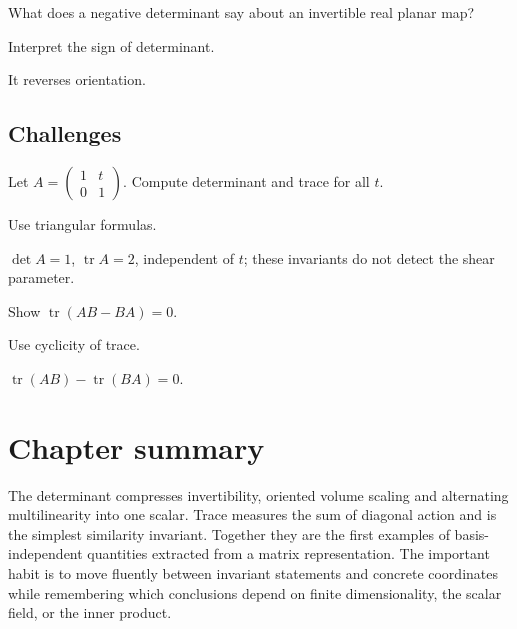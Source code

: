 \begin{exercise}\label{exr:i08-expand-14}
What does a negative determinant say about an invertible real planar map?
\end{exercise}
\begin{hint}
Interpret the sign of determinant.
\end{hint}
\begin{solution}
It reverses orientation.
\end{solution}

\subsection*{Challenges}

\begin{exercise}\label{exr:i08-expand-15}
Let \(A=\begin{pmatrix}1&t\\0&1\end{pmatrix}\). Compute determinant and trace for all \(t\).
\end{exercise}
\begin{hint}
Use triangular formulas.
\end{hint}
\begin{solution}
\(\det A=1\), \(\operatorname{tr}A=2\), independent of \(t\); these invariants do not detect the shear parameter.
\end{solution}

\begin{exercise}\label{exr:i08-expand-16}
Show \(\operatorname{tr}(AB-BA)=0\).
\end{exercise}
\begin{hint}
Use cyclicity of trace.
\end{hint}
\begin{solution}
\(\operatorname{tr}(AB)-\operatorname{tr}(BA)=0\).
\end{solution}
\section*{Chapter summary}
The determinant compresses invertibility, oriented volume scaling and alternating multilinearity into one scalar. Trace measures the sum of diagonal action and is the simplest similarity invariant. Together they are the first examples of basis-independent quantities extracted from a matrix representation.
The important habit is to move fluently between invariant statements and concrete coordinates while remembering which conclusions depend on finite dimensionality, the scalar field, or the inner product.
